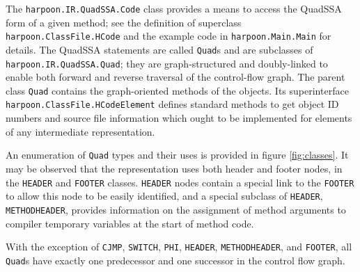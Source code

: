 \documentclass[11pt,notitlepage,twocolumn,twoside]{article}
\begin{document}
The \texttt{harpoon.IR.QuadSSA.Code}
class provides a means to access the QuadSSA form of a given method;
see the definition of superclass \texttt{harpoon.ClassFile.HCode} and
the example code in \texttt{harpoon.Main.Main} for details.  The
QuadSSA statements are called \texttt{Quad}s and are subclasses of
\texttt{harpoon.IR.QuadSSA.Quad}; they are graph-structured and
doubly-linked to enable both forward and reverse traversal of the
control-flow graph.  The parent class \texttt{Quad} contains the
graph-oriented methods of the objects.  Its superinterface
\texttt{harpoon.ClassFile.HCodeElement} defines standard methods to
get object ID numbers and source file information which
ought to be implemented for elements of any intermediate representation.

An enumeration of
\texttt{Quad} types and their uses is provided in figure
\ref{fig:classes}.  It may be observed that the representation uses both
header and footer nodes, in the \texttt{HEADER} and \texttt{FOOTER}
classes.  \texttt{HEADER} nodes contain a special link to the
\texttt{FOOTER} to allow this node to be easily identified, and a
special subclass of \texttt{HEADER}, \texttt{METHODHEADER}, provides
information on the assignment of method arguments to compiler
temporary variables at the start of method code.

With the exception of \texttt{CJMP}, \texttt{SWITCH}, \texttt{PHI},
\texttt{HEADER}, \texttt{METHODHEADER}, and \texttt{FOOTER}, all
\texttt{Quad}s have exactly one predecessor and one successor in the
control flow graph.
\end{document}
